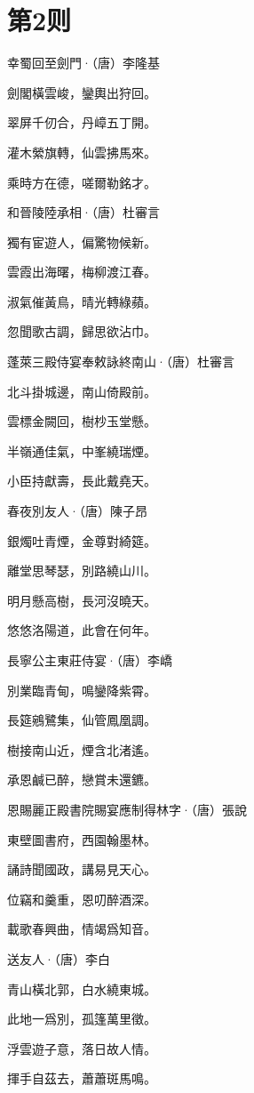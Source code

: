\documentclass[12pt,a4paper]{ctexbook}
\begin{document}
\section{第2则}
幸蜀回至劍門·（唐）李隆基\par
劍閣橫雲峻，鑾輿出狩回。\par
翠屏千仞合，丹嶂五丁開。\par
灌木縈旗轉，仙雲拂馬來。\par
乘時方在德，嗟爾勒銘才。\par
和晉陵陸承相·（唐）杜審言\par
獨有宦遊人，偏驚物候新。\par
雲霞出海曙，梅柳渡江春。\par
淑氣催黃鳥，晴光轉綠蘋。\par
忽聞歌古調，歸思欲沾巾。\par
蓬萊三殿侍宴奉敕詠終南山·（唐）杜審言\par
北斗掛城邊，南山倚殿前。\par
雲標金闕回，樹杪玉堂懸。\par
半嶺通佳氣，中峯繞瑞煙。\par
小臣持獻壽，長此戴堯天。\par
春夜別友人·（唐）陳子昂\par
銀燭吐青煙，金尊對綺筵。\par
離堂思琴瑟，別路繞山川。\par
明月懸高樹，長河沒曉天。\par
悠悠洛陽道，此會在何年。\par
長寧公主東莊侍宴·（唐）李嶠\par
別業臨青甸，鳴鑾降紫霄。\par
長筵鵷鷺集，仙管鳳凰調。\par
樹接南山近，煙含北渚遙。\par
承恩鹹已醉，戀賞未還鑣。\par
恩賜麗正殿書院賜宴應制得林字·（唐）張說\par
東壁圖書府，西園翰墨林。\par
誦詩聞國政，講易見天心。\par
位竊和羹重，恩叨醉酒深。\par
載歌春興曲，情竭爲知音。\par
送友人·（唐）李白\par
青山橫北郭，白水繞東城。\par
此地一爲別，孤篷萬里徵。\par
浮雲遊子意，落日故人情。\par
揮手自茲去，蕭蕭斑馬鳴。\par
\end{document}
